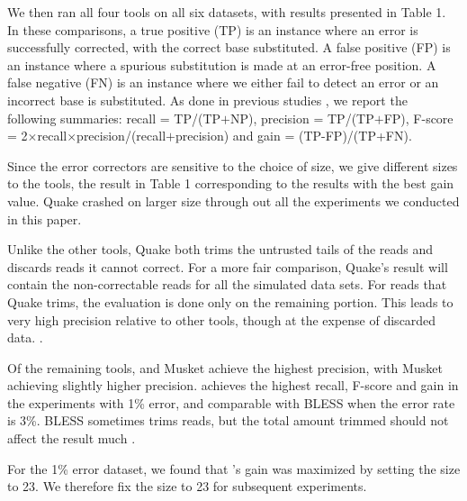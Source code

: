 \documentclass{bmcart}
\begin{document}
We then ran all four tools on all six datasets, with results presented in Table 1.  In these comparisons, a true positive (TP) is an instance where an error is successfully corrected, \thatis with the correct base substituted.  A false positive (FP) is an instance where a spurious substitution is made at an error-free position.  A false negative (FN) is an instance where we either fail to detect an error or an incorrect base is substituted.  As done in previous studies \cite{liu2013musket}, we report the following summaries: recall = TP/(TP$+$NP), precision = TP/(TP$+$FP), F-score = 2$\times$recall$\times$precision/(recall$+$precision) and gain = (TP-FP)/(TP+FN). 

Since the error correctors are sensitive to the choice of \kmer size, we give different sizes to the tools, the result in Table 1 corresponding to the results with the best gain value. Quake crashed on larger \kmer size through out all the experiments we conducted in this paper.

Unlike the other tools, Quake both trims the untrusted tails of the reads and discards reads it cannot correct. For a more fair comparison, Quake's result will contain the non-correctable reads for all the simulated data sets. For reads that Quake trims, the evaluation is done only on the remaining portion. This leads to very high precision relative to other tools, though at the expense of discarded data.  .

Of the remaining tools, \tool and Musket achieve the highest precision, with Musket achieving slightly higher precision.  \tool achieves the highest recall, F-score and gain in the experiments with 1\% error, and comparable with BLESS when the error rate is 3\%. BLESS sometimes trims reads, but the total amount trimmed should not affect the result much .

For the 1\% error dataset, we found that \tool's gain was maximized by setting the \kmer size to 23.  We therefore fix the \kmer size to 23 for subsequent experiments.
\end{document}
